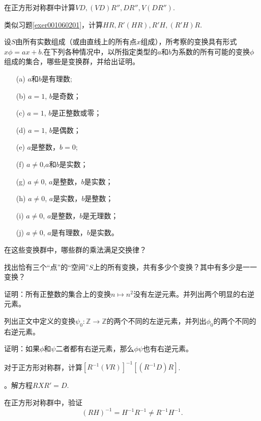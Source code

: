 \begin{problemset}
\item\label{exer001060201} 在正方形对称群中计算$VD,(VD)R'', DR'', V(DR'')$.

\item 类似习题\ref{exer001060201}，计算$HR, R'(HR), R'H, (R'H)R$.

\item 设$S$由所有实数组成（或由直线上的所有点$x$组成），所考察的变换具有形式$x\phi = ax+b$.在下列各种情况中，以所指定类型的$a$和$b$为系数的所有可能的变换$\phi$组成的集合，哪些是变换群，并给出证明。
\begin{enumerate}
\item[(a)]$a$和$b$是有理数;
\item[(b)]$a=1$, $b$是奇数； 
\item[(c)]$a=1$, $b$是正整数或零；
\item[(d)]$a=1$, $b$是偶数；
\item[(e)]$a$是整数，$b=0$;
\item[(f)]$a \neq 0$,$a$和$b$是实数；
\item[(g)]$a \neq 0$, $a$是整数，$b$是实数；
\item[(h)]$a \neq 0$, $a$是实数，$b$是整数；
\item[(i)]$a \neq 0$, $a$是整数，$b$是无理数；
\item[(j)]$a \neq 0$, $a$是有理数，$b$是实数。
\end{enumerate}
在这些变换群中，哪些群的乘法满足交换律？

\item 找出恰有三个“点”的“空间”$S$上的所有变换，共有多少个变换？其中有多少是一一变换？

\item 证明：所有正整数的集合上的变换$n \mapsto n^2$没有左逆元素。并列出两个明显的右逆元素。

\item 列出正文中定义的变换$\psi_0: \mathbb{Z} \to \mathbb{Z}$的两个不同的左逆元素，并列出$\phi_0$的两个不同的右逆元素。

\item 证明：如果$\phi$和$\psi$二者都有右逆元素，那么$\phi\psi$也有右逆元素。

\item 对于正方形对称群，计算$[R^{-1}(VR)]^{-1}[(R^{-1}D)R]$.

。解方程$RXR'=D$.

\item 在正方形对称群中，验证
\[
(RH)^{-1} = H^{-1}R^{-1} \neq R^{-1}H^{-1}.
\]


\end{problemset}
